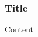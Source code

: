 \documentclass[11pt,xcolor={dvipsnames}]{beamer}
\title{}
\author{}
\date{\today}
\begin{document}
\frame{\titlepage}

\begin{frame}
  \frametitle{Title}

  Content
\end{frame}
\end{document}
